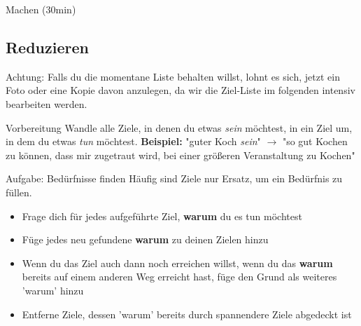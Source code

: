 \addtocounter{framenumber}{1}
\begin{frame}[standout]
    Machen (30min)
\end{frame}


\subsection{Reduzieren}

\addtocounter{framenumber}{1}
\begin{frame}[standout]
    \LARGE
    Achtung: Falls du die momentane Liste behalten willst, lohnt es sich, jetzt
    ein Foto oder eine Kopie davon anzulegen, da wir die Ziel-Liste im
    folgenden intensiv bearbeiten werden.
\end{frame}

\begin{frame}[c]{Vorbereitung}
    \Large
    Wandle alle Ziele, in denen du etwas {\em sein} möchtest, in ein Ziel um,
    in dem du etwas {\em tun} möchtest. \newline \newline \pause
    \textbf{Beispiel:} "guter Koch {\em sein}" $\rightarrow$ "so gut Kochen zu
    können, dass mir zugetraut wird, bei einer größeren Veranstaltung zu Kochen"
\end{frame}

\begin{frame}[c]{Aufgabe: Bedürfnisse finden}
    \normalsize
    Häufig sind Ziele nur Ersatz, um ein Bedürfnis zu füllen.
    \begin{itemize}[<+(1)->]
        \item Frage dich für jedes aufgeführte Ziel, \textbf{warum} du es tun möchtest
        \item Füge jedes neu gefundene \textbf{warum} zu deinen Zielen hinzu
        \item Wenn du das Ziel auch dann noch erreichen willst, wenn du das
            \textbf{warum} bereits auf einem anderen Weg erreicht hast, füge
            den Grund als weiteres 'warum' hinzu
        \item Entferne Ziele, dessen 'warum' bereits durch spannendere Ziele abgedeckt ist
    \end{itemize}
\end{frame}


